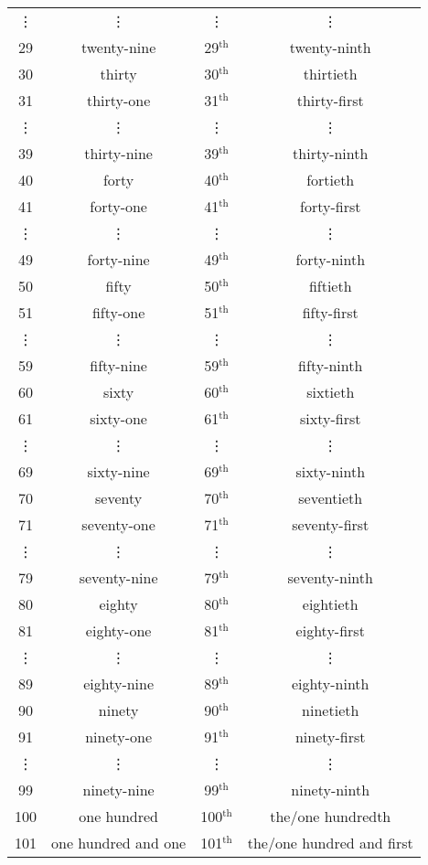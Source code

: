 \documentclass[a4paper, titlepage]{article}
\begin{document}
\begin{tabular}{cccc}
\vdots&\vdots&\vdots&\vdots\\
29&twenty-nine&29$^{\text{th}}$&twenty-ninth\\
30&thirty&30$^{\text{th}}$&thirtieth\\
31&thirty-one&31$^{\text{th}}$&thirty-first\\
\vdots&\vdots&\vdots&\vdots\\
39&thirty-nine&39$^{\text{th}}$&thirty-ninth\\
40&forty&40$^{\text{th}}$&fortieth\\
41&forty-one&41$^{\text{th}}$&forty-first\\
\vdots&\vdots&\vdots&\vdots\\
49&forty-nine&49$^{\text{th}}$&forty-ninth\\
50&fifty&50$^{\text{th}}$&fiftieth\\
51&fifty-one&51$^{\text{th}}$&fifty-first\\
\vdots&\vdots&\vdots&\vdots\\
59&fifty-nine&59$^{\text{th}}$&fifty-ninth\\
60&sixty&60$^{\text{th}}$&sixtieth\\
61&sixty-one&61$^{\text{th}}$&sixty-first\\
\vdots&\vdots&\vdots&\vdots\\
69&sixty-nine&69$^{\text{th}}$&sixty-ninth\\
70&seventy&70$^{\text{th}}$&seventieth\\
71&seventy-one&71$^{\text{th}}$&seventy-first\\
\vdots&\vdots&\vdots&\vdots\\
79&seventy-nine&79$^{\text{th}}$&seventy-ninth\\
80&eighty&80$^{\text{th}}$&eightieth\\
81&eighty-one&81$^{\text{th}}$&eighty-first\\
\vdots&\vdots&\vdots&\vdots\\
89&eighty-nine&89$^{\text{th}}$&eighty-ninth\\
90&ninety&90$^{\text{th}}$&ninetieth\\
91&ninety-one&91$^{\text{th}}$&ninety-first\\
\vdots&\vdots&\vdots&\vdots\\
99&ninety-nine&99$^{\text{th}}$&ninety-ninth\\
100&one hundred&100$^{\text{th}}$&the/one hundredth\\
101&one hundred and one&101$^{\text{th}}$&the/one hundred and first\\

\end{tabular}
\end{document}
